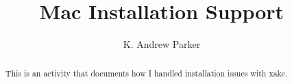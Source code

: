 \documentclass{xourse}
\title{Mac Installation Support}
\author{K. Andrew Parker}
\begin{document}
\begin{abstract}
This is an activity that documents how I handled installation issues with xake.
\end{abstract}
\maketitle

\end{document}
